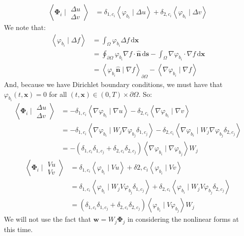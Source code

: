 \documentclass{article}
\newcommand{\bvec}[1]{\boldsymbol{#1}}
\newcommand{\brvec}[1]{\mathbf{#1}}
\newcommand{\dd}{\mathrm{d}}
\begin{document}
\begin{align*}
    \left< \bvec{\Phi}_i \mid \begin{matrix}
        \Delta u \\
        \Delta v
    \end{matrix} \right>
    & = \delta_{1, c_i} \left< \varphi_{b_i} \mid \Delta u \right>
        + \delta_{2, c_i} \left< \varphi_{b_i} \mid \Delta v \right>
\end{align*}
\noindent We note that:
\begin{align*}
    \left< \varphi_{b_i} \mid \Delta f \right>
    & = \int_\Omega \varphi_{b_i} \Delta f \, \dd \bvec{x} \\
    & = \oint_{\partial \Omega} \varphi_{b_i} \nabla f \cdot \hat{\brvec{n}} \, \dd \bvec{s}
        - \int_\Omega \nabla \varphi_{b_i} \cdot \nabla f \, \dd \bvec{x} \\
    & = \left< \varphi_{b_i} \hat{\brvec{n}} \mid \nabla f \right>_{\partial \Omega}
        - \left< \nabla \varphi_{b_i} \mid \nabla f \right>
\end{align*}
\noindent And, because we have Dirichlet boundary conditions,
we must have that $\varphi_{b_i}(t, \bvec{x}) = 0$
for all $(t, \bvec{x}) \in (0, T) \times \partial \Omega$. So:
\begin{align*}
    \left< \bvec{\Phi}_i \mid \begin{matrix}
        \Delta u \\
        \Delta v
    \end{matrix} \right>
    & = -\delta_{1, c_i} \left< \nabla \varphi_{b_i} \mid \nabla u \right>
        - \delta_{2, c_i} \left< \nabla \varphi_{b_i} \mid \nabla v \right> \\
    & = -\delta_{1, c_i} \left< \nabla \varphi_{b_i} \mid W_j \nabla \varphi_{b_j} \delta_{1, c_j} \right>
        - \delta_{2, c_i} \left< \nabla \varphi_{b_i} \mid W_j \nabla \varphi_{b_j} \delta_{2, c_j} \right> \\
    & = -(\delta_{1, c_i} \delta_{1, c_j} + \delta_{2, c_i} \delta_{2, c_j})
        \left< \nabla \varphi_{b_i} \mid \nabla \varphi_{b_j} \right> W_j
\end{align*}
\begin{align*}
    \left< \bvec{\Phi}_i \mid \begin{matrix}
        V u \\
        V v
    \end{matrix} \right>
    & = \delta_{1, c_i} \left< \varphi_{b_i} \mid V u \right>
        + \delta{2, c_i} \left< \varphi_{b_i} \mid V v \right> \\
    & = \delta_{1, c_i} \left< \varphi_{b_i} \mid W_j V \varphi_{b_j} \delta_{1, c_j} \right>
        + \delta_{2, c_i} \left< \varphi_{b_i} \mid W_j V \varphi_{b_j} \delta_{2, c_j} \right> \\
    & = (\delta_{1, c_i} \delta_{1, c_j} + \delta_{2, c_i} \delta_{2, c_j})
        \left< \varphi_{b_i} \mid V \varphi_{b_j} \right> W_j
\end{align*}
\noindent We will not use the fact that $\bvec{w} = W_j \bvec{\Phi}_j$
in considering the nonlinear forms at this time.
\end{document}
